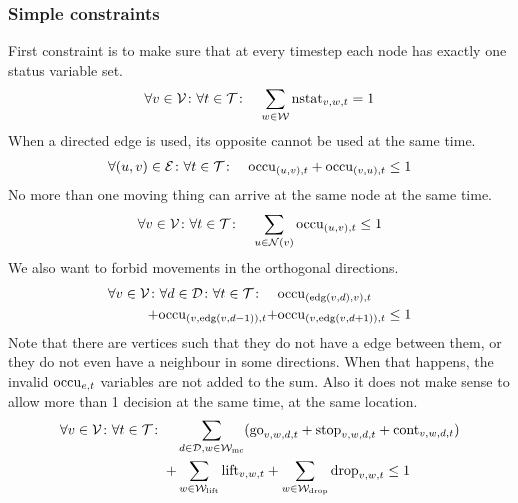 \subsubsection{Simple constraints}
\label{sec:simple}
First constraint is to make sure that at every timestep each node has exactly
one status variable set.
\begin{align}
    &\forall v \in \mathcal{V} \colon \forall t \in \mathcal{T} \colon & \sum_{w \in \mathcal{W}}
    \mathrm{nstat}_{v,w,t} = 1
\end{align}
When a directed edge is used, its opposite cannot be used at the same time.
\begin{align}
    &\forall (u,v) \in \mathcal{E} \colon \forall t \in \mathcal{T} \colon & \mathrm{occu}_{(u,v),t} +
    \mathrm{occu}_{(v,u),t} \leq 1
\end{align}
No more than one moving thing can arrive at the same node at the same time.
\begin{align}
    &\forall v \in \mathcal{V} \colon \forall t \in \mathcal{T} \colon & \sum_{u \in \mathcal{N}(v)}
    \mathrm{occu}_{(u,v),t} \leq 1
\end{align}
We also want to forbid movements in the orthogonal directions.
\begin{equation}
    \begin{split}
        \forall v \in \mathcal{V} \colon \forall d \in \mathcal{D} \colon \forall t \in \mathcal{T} \colon
        \quad & \mathrm{occu}_{(\mathrm{edg}(v,d),v),t} \\ + \mathrm{occu}_{(v,\mathrm{edg}(v,d-1)),t} + &
        \mathrm{occu}_{(v,\mathrm{edg}(v,d+1)),t} \leq 1
    \end{split}
\end{equation}
Note that there are vertices such that they do not have a edge between them, or
they do not even have a neighbour in some directions. When that happens, the
invalid $\mathrm{occu}_{e,t}$ variables are not added to the sum.
Also it does not make sense to allow more than 1 decision at the same time, at
the same location.
\begin{equation}
    \begin{split}
        \forall v \in \mathcal{V} \colon \forall t \in \mathcal{T} \colon \quad & \sum_{d \in \mathcal{D},
        w \in \mathcal{W}_\mathrm{mc}}(\mathrm{go}_{v,w,d,t} + \mathrm{stop}_{v,w,d,t} + \mathrm{cont}_{v,w,d,t}) \\ + &
        \sum_{w \in \mathcal{W}_\mathrm{lift}} \mathrm{lift}_{v,w,t} + \sum_{w \in \mathcal{W}_\mathrm{drop}} \mathrm{drop}_{v,w,t} \leq 1
    \end{split}
\end{equation}

